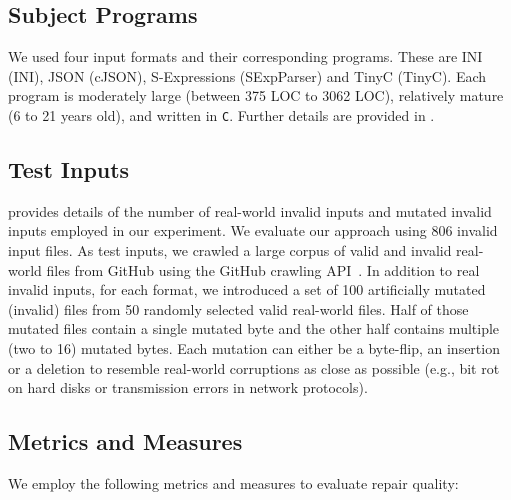 \documentclass[acmsmall,screen,review,anonymous]{acmart}
\def\<#1>{\texttt{#1}}
\begin{document}


\subsection{Subject Programs} %
We used four input formats and their corresponding programs. These are INI (INI), JSON (cJSON), S-Expressions (SExpParser) and TinyC (TinyC). Each program is moderately large (between 375 LOC to 3062 LOC), relatively mature (6 to 21 years old), and written in \<C>. Further details are provided in .

\subsection{Test Inputs} 
 provides details of the number of
real-world invalid inputs and mutated invalid inputs employed in our experiment.
We evaluate our approach using 806 invalid input files. %
As test inputs, we crawled a large corpus of valid and invalid real-world files
from GitHub using the GitHub crawling API~\cite{githubapi}. 
In addition to real invalid inputs, for each format, we introduced a set of 100 artificially mutated (invalid) files
from 50 randomly selected valid real-world files.
Half of those mutated files contain a single mutated byte and the other half
contains multiple (two to 16) mutated bytes.
Each mutation can either be a byte-flip, an insertion or a deletion to 
resemble real-world corruptions as close as possible
(e.g., bit rot on hard disks or transmission errors in network protocols).


\subsection{Metrics and Measures} We employ the following metrics and measures to evaluate repair quality: 
\end{document}
